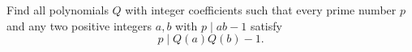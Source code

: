 Find all polynomials $Q$ with integer coefficients such that
every prime number $p$ and any two positive integers $a,b$ with $p\mid ab-1$ satisfy
$$p\mid Q(a)Q(b)-1.$$
